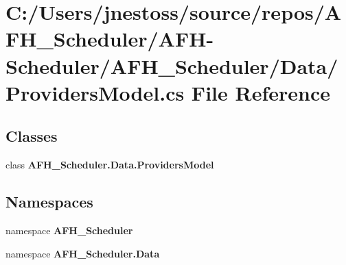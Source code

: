 \section{C\+:/\+Users/jnestoss/source/repos/\+A\+F\+H\+\_\+\+Scheduler/\+A\+F\+H-\/\+Scheduler/\+A\+F\+H\+\_\+\+Scheduler/\+Data/\+Providers\+Model.cs File Reference}
\label{_providers_model_8cs}
\subsection*{Classes}
\begin{DoxyCompactItemize}
\item 
class \textbf{ A\+F\+H\+\_\+\+Scheduler.\+Data.\+Providers\+Model}
\end{DoxyCompactItemize}
\subsection*{Namespaces}
\begin{DoxyCompactItemize}
\item 
namespace \textbf{ A\+F\+H\+\_\+\+Scheduler}
\item 
namespace \textbf{ A\+F\+H\+\_\+\+Scheduler.\+Data}
\end{DoxyCompactItemize}
